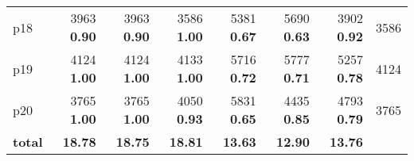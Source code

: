 \begin{tabular}{lrrrrrrr}
\multicolumn{1}{l|}{p18} & {\footnotesize 3963} \textbf{0.90} & {\footnotesize 3963} \textbf{0.90} & {\footnotesize 3586} \textbf{1.00} & {\footnotesize 5381} \textbf{0.67} & {\footnotesize 5690} \textbf{0.63} & {\footnotesize 3902} \textbf{0.92} & \multicolumn{1}{|r}{3586}\\
\multicolumn{1}{l|}{p19} & {\footnotesize 4124} \textbf{1.00} & {\footnotesize 4124} \textbf{1.00} & {\footnotesize 4133} \textbf{1.00} & {\footnotesize 5716} \textbf{0.72} & {\footnotesize 5777} \textbf{0.71} & {\footnotesize 5257} \textbf{0.78} & \multicolumn{1}{|r}{4124}\\
\multicolumn{1}{l|}{p20} & {\footnotesize 3765} \textbf{1.00} & {\footnotesize 3765} \textbf{1.00} & {\footnotesize 4050} \textbf{0.93} & {\footnotesize 5831} \textbf{0.65} & {\footnotesize 4435} \textbf{0.85} & {\footnotesize 4793} \textbf{0.79} & \multicolumn{1}{|r}{3765}\\
\midrule
\textbf{total} & \textbf{18.78} & \textbf{18.75} & \textbf{18.81} & \textbf{13.63} & \textbf{12.90} & \textbf{13.76} & \\
\bottomrule
\end{tabular}

